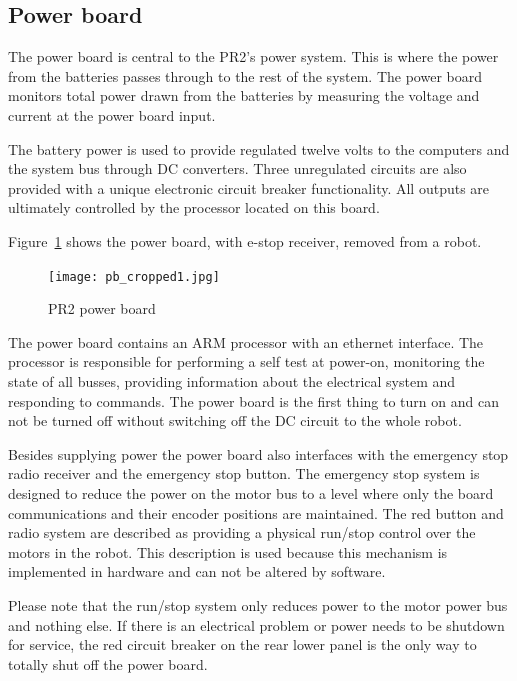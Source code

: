 \subsection{Power board}
The power board is central to the PR2's power system. This is where
the power from the batteries passes through to the rest of the
system. The power board monitors total power drawn from the batteries
by measuring the voltage and current at the power board input.

The battery power is used to provide regulated twelve volts to the computers and
the system bus through DC converters. Three unregulated circuits are also
provided with a unique electronic circuit breaker functionality. All outputs are
ultimately controlled by the processor located on this board.

Figure~\ref{fig:power_board} shows the power board, with e-stop receiver, removed from a robot.

\begin{figure}[tb]
\centering
\texttt{[image: pb\_cropped1.jpg]}
\caption{PR2 power board}
\label{fig:power_board}
\end{figure}


The power board contains an ARM processor with an ethernet interface. The
processor is responsible for performing a self test at power-on, monitoring the
state of all busses, providing information about the electrical system and
responding to commands. The power board is the first thing to turn on and can
not be turned off without switching off the DC circuit to the whole robot.

Besides supplying power the power board also interfaces with the emergency stop
radio receiver and the emergency stop button. The emergency stop system is
designed to reduce the power on the motor bus to a level where only the board
communications and their encoder positions are maintained. The red button and
radio system are described as providing a physical run/stop control over the
motors in the robot. This description is used because this mechanism is
implemented in hardware and can not be altered by software.

Please note that the run/stop system only reduces power to the motor power bus
and nothing else. If there is an electrical problem or power needs to be
shutdown for service, the red circuit breaker on the rear lower panel is the
only way to totally shut off the power board.\\

